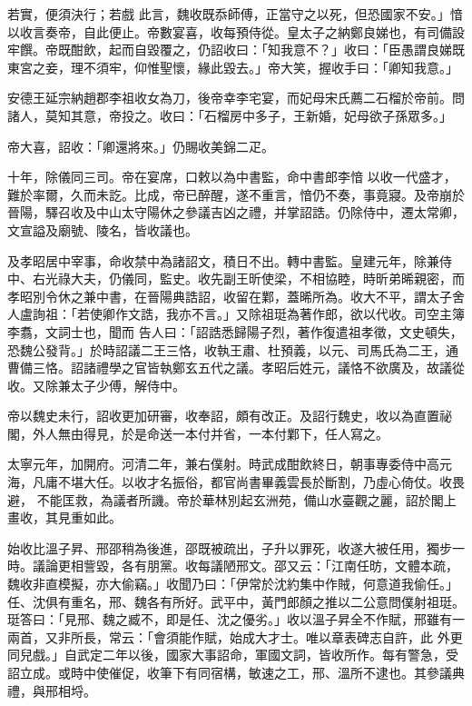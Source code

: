 \begin{pinyinscope}
 若實，便須決行；若戲
 此言，魏收既忝師傅，正當守之以死，但恐國家不安。」愔以收言奏帝，自此便止。帝數宴喜，收每預侍從。皇太子之納鄭良娣也，有司備設牢饌。帝既酣飲，起而自毀覆之，仍詔收曰：「知我意不？」收曰：「臣愚謂良娣既東宮之妾，理不須牢，仰惟聖懷，緣此毀去。」帝大笑，握收手曰：「卿知我意。」



 安德王延宗納趙郡李祖收女為刀，後帝幸李宅宴，而妃母宋氏薦二石榴於帝前。問諸人，莫知其意，帝投之。收曰：「石榴房中多子，王新婚，妃母欲子孫眾多。」



 帝大喜，詔收：「卿還將來。」仍賜收美錦二疋。



 十年，除儀同三司。帝在宴席，口敕以為中書監，命中書郎李愔
 以收一代盛才，難於率爾，久而未訖。比成，帝已醉醒，遂不重言，愔仍不奏，事竟寢。及帝崩於晉陽，驛召收及中山太守陽休之參議吉凶之禮，并掌詔誥。仍除侍中，遷太常卿，文宣謚及廟號、陵名，皆收議也。



 及孝昭居中宰事，命收禁中為諸詔文，積日不出。轉中書監。皇建元年，除兼侍中、右光祿大夫，仍儀同，監史。收先副王昕使梁，不相協睦，時昕弟晞親密，而孝昭別令休之兼中書，在晉陽典誥詔，收留在鄴，蓋晞所為。收大不平，謂太子舍人盧詢祖：「若使卿作文誥，我亦不言。」又除祖珽為著作郎，欲以代收。司空主簿李翥，文詞士也，聞而
 告人曰：「詔誥悉歸陽子烈，著作復遣祖孝徵，文史頓失，恐魏公發背。」於時詔議二王三恪，收執王肅、杜預義，以元、司馬氏為二王，通曹備三恪。詔諸禮學之官皆執鄭玄五代之議。孝昭后姓元，議恪不欲廣及，故議從收。又除兼太子少傅，解侍中。



 帝以魏史未行，詔收更加研審，收奉詔，頗有改正。及詔行魏史，收以為直置祕閣，外人無由得見，於是命送一本付并省，一本付鄴下，任人寫之。



 太寧元年，加開府。河清二年，兼右僕射。時武成酣飲終日，朝事專委侍中高元海，凡庸不堪大任。以收才名振俗，都官尚書畢義雲長於斷割，乃虛心倚仗。收畏避，
 不能匡救，為議者所譏。帝於華林別起玄洲苑，備山水臺觀之麗，詔於閣上畫收，其見重如此。



 始收比溫子昇、邢邵稍為後進，邵既被疏出，子升以罪死，收遂大被任用，獨步一時。議論更相訾毀，各有朋黨。收每議陋邢文。邵又云：「江南任昉，文體本疏，魏收非直模擬，亦大偷竊。」收聞乃曰：「伊常於沈約集中作賊，何意道我偷任。」任、沈俱有重名，邢、魏各有所好。武平中，黃門郎顏之推以二公意問僕射祖珽。珽答曰：「見邢、魏之臧不，即是任、沈之優劣。」收以溫子昇全不作賦，邢雖有一兩首，又非所長，常云：「會須能作賦，始成大才士。唯以章表碑志自許，此
 外更同兒戲。」自武定二年以後，國家大事詔命，軍國文詞，皆收所作。每有警急，受詔立成。或時中使催促，收筆下有同宿構，敏速之工，邢、溫所不逮也。其參議典禮，與邢相埒。




\end{pinyinscope}
